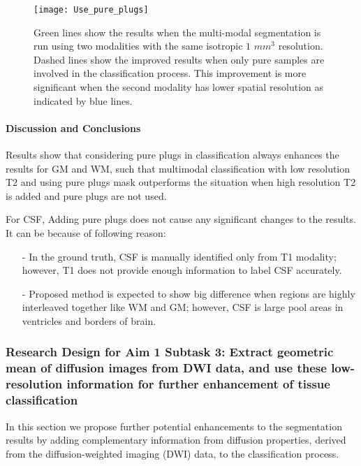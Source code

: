 \begin{figure}
\centering
\texttt{[image: Use\_pure\_plugs]}\
\centering
\caption{Green lines show the results when the multi-modal segmentation is run using two modalities with the same isotropic $1$ $mm^3$ resolution. Dashed lines show the improved results when only pure samples are involved in the classification process. This improvement is more significant when the second modality has lower spatial resolution as indicated by blue lines.}
\label{fig:Use_pure_plugs}
\end{figure}

\paragraph{Discussion and Conclusions}

Results show that considering pure plugs in classification always enhances the results for GM and WM, such that multimodal classification with low resolution T2 and using pure plugs mask outperforms the situation when high resolution T2 is added and pure plugs are not used.

For CSF, Adding pure plugs does not cause any significant changes to the results. It can be because of following reason:
\begin{itemize}
    \item[-] In the ground truth, CSF is manually identified only from T1 modality; however, T1 does not provide enough information to label CSF accurately.
    \item[-] Proposed method is expected to show big difference when regions are highly interleaved together like WM and GM; however, CSF is large pool areas in ventricles and borders of brain.
\end{itemize}


\subsubsection{Research Design for Aim 1 Subtask 3: Extract geometric mean of diffusion images from DWI data, and use these low-resolution information for further enhancement of tissue classification}
\label{section:Aim1Subtask3ResearchDesign} %

In this section we propose further potential enhancements to the segmentation results by adding complementary information from diffusion properties, derived from the diffusion-weighted imaging (DWI) data, to the classification process.

